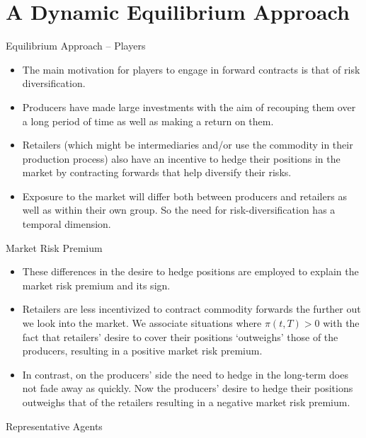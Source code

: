 \section{A Dynamic Equilibrium Approach}


{Equilibrium Approach -- Players}

\begin{itemize}
\item<1->
The main
motivation for players to engage in forward contracts is that of
risk diversification.
\item<2->
Producers have made large investments with the
aim of recouping them over a long period of time as well as making a
return on them.
\item<3->
Retailers (which might be intermediaries and/or use the commodity in
their production process) also have an incentive to hedge their
positions in the market by contracting forwards that help diversify
their risks.
\item<4->
Exposure to the market will differ both between producers and
retailers as well as within their own group.
So the need for risk-diversification has a temporal dimension.
\end{itemize}




{Market Risk Premium}

\begin{itemize}
\item<1-> These differences in the
desire to hedge positions are employed to explain the market risk premium and
its sign.
\item<2-> Retailers are less incentivized to contract commodity forwards
the further out we look into the market. We associate situations where
$\pi(t,T)>0$ with the fact that retailers' desire to cover their
positions `outweighs' those of the producers, resulting in a
positive market risk premium.
\item<3-> In contrast, on the producers' side the need to hedge in the long-term
does not fade away as quickly. Now the producers' desire to hedge their positions outweighs that of the retailers resulting in a negative market risk premium.
\end{itemize}







{Representative Agents}

